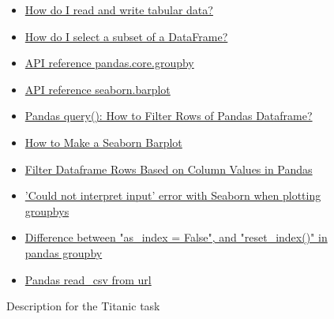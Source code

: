\begin{figure}
\begin{mdframed}[backgroundcolor=gray!04]
\begin{scriptsize}
\begin{itemize}
    \item \href{https://pandas.pydata.org/docs/getting_started/intro_tutorials/02_read_write.html}{How do I read and write tabular data?}
    \item \href{https://pandas.pydata.org/docs/getting_started/intro_tutorials/03_subset_data.html}{How do I select a subset of a DataFrame?}
    \item \href{https://pandas.pydata.org/docs/reference/index.html}{API reference pandas.core.groupby}
    \item \href{https://seaborn.pydata.org/generated/seaborn.barplot.html}{API reference seaborn.barplot}
    \item \href{https://cmdlinetips.com/2019/07/how-to-select-rows-of-pandas-dataframe-with-query-function/}{Pandas query(): How to Filter Rows of Pandas Dataframe?}
    \item \href{https://seaborn.pydata.org/generated/seaborn.barplot.html}{How to Make a Seaborn Barplot}
    \item \href{https://www.delftstack.com/howto/python-pandas/how-to-filter-dataframe-rows-based-on-column-values-in-pandas/}{Filter Dataframe Rows Based on Column Values in Pandas}
    \item \href{https://stackoverflow.com/questions/32908315/could-not-interpret-input-error-with-seaborn-when-plotting-groupbys}{'Could not interpret input' error with Seaborn when plotting groupbys}
    \item \href{https://stackoverflow.com/questions/51866908/difference-between-as-index-false-and-reset-index-in-pandas-groupby}{Difference between "as\_index = False", and "reset\_index()" in pandas groupby}
    \item \href{https://stackoverflow.com/questions/32400867/pandas-read-csv-from-url}{Pandas read\_csv from url}
\end{itemize}

\end{scriptsize}
\end{mdframed}
\caption{Description for the Titanic task}
\end{figure}

    